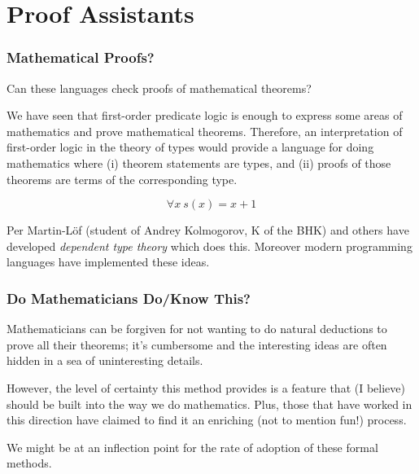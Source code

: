 \documentclass{beamer}
\theoremstyle{indentDefn} \newtheorem{defn}[]{Definition}
\begin{document}
\section{Proof Assistants}

\begin{frame}
  \frametitle{Mathematical Proofs?}

  Can these languages check proofs of mathematical theorems? 
  
  We have seen that first-order predicate logic is enough to express some areas of mathematics and prove mathematical theorems. Therefore, an interpretation of first-order logic in the theory of types would provide a language for doing mathematics where (i) theorem statements are types, and (ii) proofs of those theorems are terms of the corresponding type. 

  $$\forall x \ s(x) = x + 1$$

  Per Martin-L\"{o}f (student of Andrey Kolmogorov, K of the BHK) and others have developed \emph{dependent type theory} which does this. Moreover modern programming languages have implemented these ideas. 


\end{frame}

\begin{frame}
  \frametitle{Do Mathematicians Do/Know This?}

  Mathematicians can be forgiven for not wanting to do natural deductions to prove all their theorems; it's cumbersome and the interesting ideas are often hidden in a sea of uninteresting details. 


  However, the level of certainty this method provides is a feature that (I believe) should be built into the way we do mathematics. Plus, those that have worked in this direction have claimed to find it an enriching (not to mention fun!) process. 

  We might be at an inflection point for the rate of adoption of these formal methods. 
\end{frame}
\end{document}

